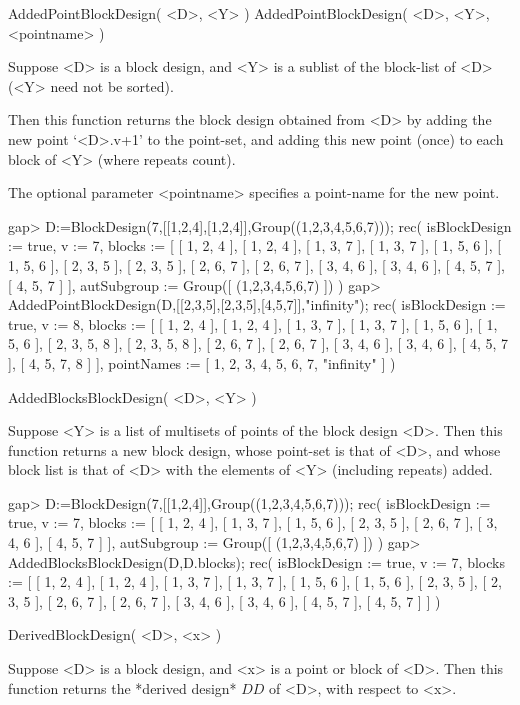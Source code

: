 \>AddedPointBlockDesign( <D>, <Y> )
\>AddedPointBlockDesign( <D>, <Y>, <pointname> )

Suppose <D> is a block design, and <Y> is a sublist of the block-list
of <D> (<Y> need not be sorted).

Then this function returns the block design obtained from <D> by adding
the new point `<D>.v+1' to the point-set, and adding this new point
(once) to each block of <Y> (where repeats count).

The optional parameter <pointname> specifies a point-name for the
new point.

\beginexample
gap> D:=BlockDesign(7,[[1,2,4],[1,2,4]],Group((1,2,3,4,5,6,7)));
rec( isBlockDesign := true, v := 7, 
  blocks := [ [ 1, 2, 4 ], [ 1, 2, 4 ], [ 1, 3, 7 ], [ 1, 3, 7 ], 
      [ 1, 5, 6 ], [ 1, 5, 6 ], [ 2, 3, 5 ], [ 2, 3, 5 ], [ 2, 6, 7 ], 
      [ 2, 6, 7 ], [ 3, 4, 6 ], [ 3, 4, 6 ], [ 4, 5, 7 ], [ 4, 5, 7 ] ], 
  autSubgroup := Group([ (1,2,3,4,5,6,7) ]) )
gap> AddedPointBlockDesign(D,[[2,3,5],[2,3,5],[4,5,7]],"infinity");
rec( isBlockDesign := true, v := 8, 
  blocks := [ [ 1, 2, 4 ], [ 1, 2, 4 ], [ 1, 3, 7 ], [ 1, 3, 7 ], 
      [ 1, 5, 6 ], [ 1, 5, 6 ], [ 2, 3, 5, 8 ], [ 2, 3, 5, 8 ], [ 2, 6, 7 ], 
      [ 2, 6, 7 ], [ 3, 4, 6 ], [ 3, 4, 6 ], [ 4, 5, 7 ], [ 4, 5, 7, 8 ] ], 
  pointNames := [ 1, 2, 3, 4, 5, 6, 7, "infinity" ] )
\endexample



\>AddedBlocksBlockDesign( <D>, <Y> )

Suppose <Y> is a list of multisets of points of the block design <D>.
Then this function returns a new block design, whose point-set is that
of <D>, and whose block list is that of <D> with the elements of <Y>
(including repeats) added.

\beginexample
gap> D:=BlockDesign(7,[[1,2,4]],Group((1,2,3,4,5,6,7)));           
rec( isBlockDesign := true, v := 7, 
  blocks := [ [ 1, 2, 4 ], [ 1, 3, 7 ], [ 1, 5, 6 ], [ 2, 3, 5 ], 
      [ 2, 6, 7 ], [ 3, 4, 6 ], [ 4, 5, 7 ] ], 
  autSubgroup := Group([ (1,2,3,4,5,6,7) ]) )
gap> AddedBlocksBlockDesign(D,D.blocks);
rec( isBlockDesign := true, v := 7, 
  blocks := [ [ 1, 2, 4 ], [ 1, 2, 4 ], [ 1, 3, 7 ], [ 1, 3, 7 ], 
      [ 1, 5, 6 ], [ 1, 5, 6 ], [ 2, 3, 5 ], [ 2, 3, 5 ], [ 2, 6, 7 ], 
      [ 2, 6, 7 ], [ 3, 4, 6 ], [ 3, 4, 6 ], [ 4, 5, 7 ], [ 4, 5, 7 ] ] )
\endexample



\>DerivedBlockDesign( <D>, <x> )

Suppose <D> is a block design, and <x> is a point or block of <D>.
Then this function returns the *derived design*
$DD$ of <D>, with respect to <x>.

